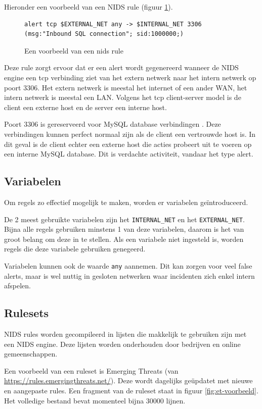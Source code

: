 \documentclass[a4paper, 12pt]{report}
\begin{document}
Hieronder een voorbeeld van een NIDS rule (figuur \ref{fig:nids-rule}).

\begin{figure}[H]
  \begin{lstlisting}
alert tcp $EXTERNAL_NET any -> $INTERNAL_NET 3306 (msg:"Inbound SQL connection"; sid:1000000;)
  \end{lstlisting}
  \caption{Een voorbeeld van een nids rule}
  \label{fig:nids-rule}
\end{figure}

Deze rule zorgt ervoor dat er een alert wordt gegenereerd wanneer de NIDS engine een tcp verbinding ziet van het extern netwerk naar het intern netwerk op poort 3306.
Het extern netwerk is meestal het internet of een ander WAN, het intern netwerk is meestal een LAN.
Volgens het tcp client-server model is de client een externe host en de server een interne host.

Poort 3306 is gereserveerd voor MySQL database verbindingen \autocite{iana:ports}.
Deze verbindingen kunnen perfect normaal zijn als de client een vertrouwde host is.
In dit geval is de client echter een externe host die acties probeert uit te voeren op een interne MySQL database.
Dit is verdachte activiteit, vandaar het type alert.

\subsection{Variabelen}
Om regels zo effectief mogelijk te maken, worden er variabelen geïntroduceerd.

De 2 meest gebruikte variabelen zijn het \lstinline|INTERNAL_NET| en het \lstinline|EXTERNAL_NET|.
Bijna alle regels gebruiken minstens 1 van deze variabelen, daarom is het van groot belang om deze in te stellen.
Als een variabele niet ingesteld is, worden regels die deze variabele gebruiken genegeerd.

Variabelen kunnen ook de waarde \lstinline|any| aannemen.
Dit kan zorgen voor veel false alerts, maar is wel nuttig in gesloten netwerken waar incidenten zich enkel intern afspelen.

\subsection{Rulesets}
NIDS rules worden gecompileerd in lijsten die makkelijk te gebruiken zijn met een NIDS engine.
Deze lijsten worden onderhouden door bedrijven en online gemeenschappen.

Een voorbeeld van een ruleset is Emerging Threats (van \url{https://rules.emergingthreats.net/}).
Deze wordt dagelijks geüpdatet met nieuwe en aangepaste rules.
Een fragment van de ruleset staat in figuur \ref{fig:et-voorbeeld}.
Het volledige bestand bevat momenteel bijna $30000$ lijnen.
\end{document}
